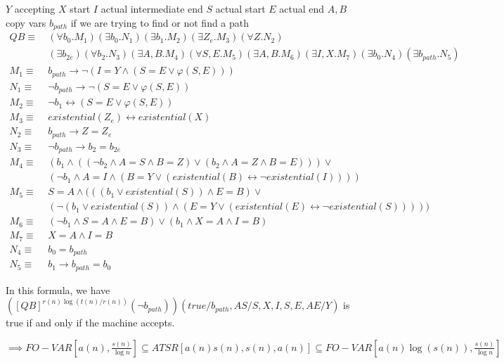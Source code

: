 \(Y\) accepting \(X\) start \(I\) actual intermediate end \(S\) actual
start \(E\) actual end \(A, B\) copy vars \(b_{path}\) if we are trying
to find or not find a path \[
\begin{aligned}
QB \equiv&~(\forall b_{0}.M_{1})(\exists b_{0}.N_{1})(\exists b_{1}.M_{2})(\exists Z_{e}.M_{3})(\forall Z.N_{2})\\
&~(\exists b_{2e})(\forall b_{2}.N_{3})(\exists A, B.M_{4})(\forall S, E.M_{5})(\exists A, B.M_{6})(\exists I, X.M_{7})(\exists b_{0}.N_{4})(\exists b_{path}.N_{5}) \\
M_{1} \equiv&~b_{path} \to \neg(I = Y \land (S = E \lor \varphi(S, E))) \\
N_{1} \equiv&~\neg b_{path} \to \neg(S = E \lor \varphi(S, E)) \\
M_{2} \equiv&~\neg b_{1} \leftrightarrow (S = E \lor \varphi(S, E)) \\
M_{3} \equiv&~existential(Z_{e}) \leftrightarrow existential(X)\\
N_{2} \equiv&~b_{path} \to Z = Z_{e}\\
N_{3} \equiv&~ \neg b_{path} \to b_{2} = b_{2e}\\
M_{4} \equiv&~(b_{1} \land ((\neg b_{2} \land A = S  \land B = Z) \lor (b_{2} \land A = Z \land B = E))) \lor \\
&~(\neg b_{1} \land  A = I \land (B = Y \lor (existential(B) \leftrightarrow \neg existential(I)))) \\
M_{5} \equiv&~S = A \land ((( b_{1} \lor existential(S)) \land E = B) \lor \\
&~(\neg( b_{1} \lor existential(S)) \land (E = Y \lor (existential(E)\leftrightarrow \neg existential(S))))) \\
M_{6} \equiv&~(\neg b_{1}  \land S = A \land E = B) \lor (b_{1} \land X = A \land I = B)\\
M_{7} \equiv&~X = A \land I = B \\
N_{4} \equiv&~b_{0} = b_{path} \\
N_{5} \equiv&~b_{1} \to b_{path} = b_{0}
\end{aligned}
\]

In this formula, we have
\(\left([QB]^{r(n)\log(t(n)/r(n))}(\neg b_{path})\right)(true / b_{path}, AS / S, X, I, S, E, AE / Y)\)
is true if and only if the machine accepts.

\(\implies FO-VAR\left[ a(n), \frac{s(n)}{\log n} \right] \subseteq ATSR[a(n)s(n), s(n), a(n)] \subseteq FO-VAR\left[ a(n)\log(s(n)), \frac{s(n)}{\log n} \right]\)
